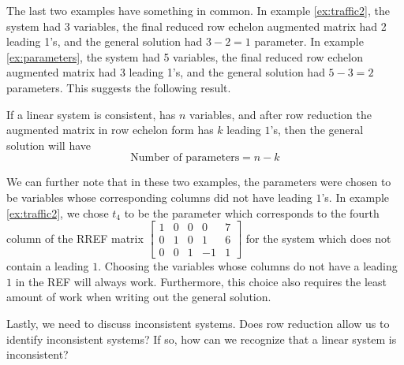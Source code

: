 The last two examples have something in common. In example \ref{ex:traffic2}, the system had 3 variables, the final reduced row echelon augmented matrix had 2 leading 1's, and the general solution had $3-2 = 1$ parameter. In example \ref{ex:parameters}, the system had 5 variables, the final reduced row echelon augmented matrix had $3$ leading 1's, and the general solution had $5-3 = 2$ parameters. This suggests the following result.

\begin{theorem}
	If a linear system is consistent, has $n$ variables, and after row reduction the augmented matrix in row echelon form has $k$ leading $1$'s, then the general solution will have 
	\[
		\text{Number of parameters} = n - k
	\]
\end{theorem}

We can further note that in these two examples, the parameters were chosen to be variables whose corresponding columns did not have leading $1$'s. In example \ref{ex:traffic2}, we chose $t_4$ to be the parameter which corresponds to the fourth column of the RREF matrix $\begin{bmatrix} 1 & 0 & 0 & 0 & 7 \\ 0 & 1 & 0 & 1 & 6 \\ 0 & 0 & 1 & -1 & 1\end{bmatrix}$ for the system which does not contain a leading $1$. Choosing the variables whose columns do not have a leading $1$ in the REF will always work. Furthermore, this choice also requires the least amount of work when writing out the general solution.

Lastly, we need to discuss inconsistent systems. Does row reduction allow us to identify inconsistent systems? If so, how can we recognize that a linear system is inconsistent?

